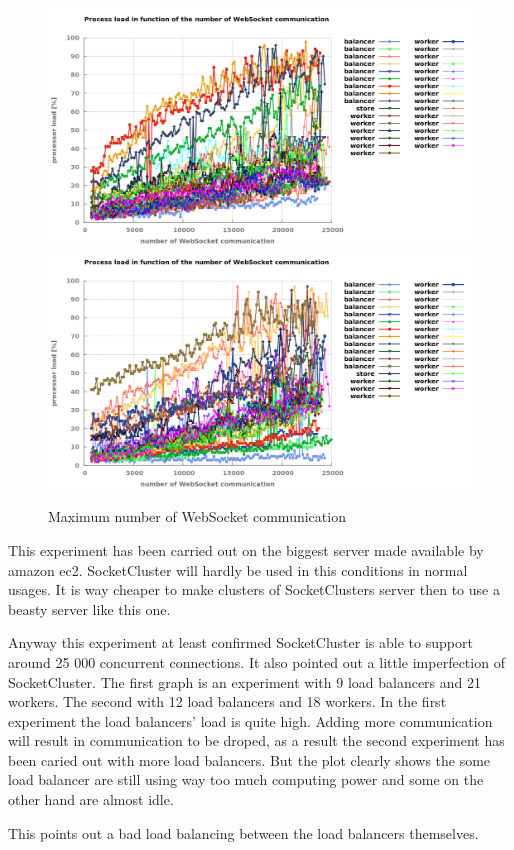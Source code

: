 \begin{figure}[H]
	\centering
		\includegraphics[width=\textwidth]{./Figures/9balancer.png}
		\includegraphics[width=\textwidth]{./Figures/12balancer.png}
	\caption[Maximum number of WebSocket communication]{Maximum number of WebSocket communication}
	\label{fig:max_communication}
\end{figure}

This experiment has been carried out on the biggest server made available by
amazon ec2.  SocketCluster will hardly be used in this conditions in normal
usages.  It is way cheaper to make clusters of SocketClusters server then to
use a beasty server like this one.

Anyway this experiment at least confirmed SocketCluster is able to support
around 25 000 concurrent connections. It also pointed out a little imperfection
of SocketCluster. The first graph is an experiment with 9 load balancers and 21
workers. The second with 12 load balancers and 18 workers.  In the first
experiment the load balancers' load is quite high. Adding more communication
will result in communication to be droped, as a result the second experiment
has been caried out with more load balancers. But the plot clearly shows the
some load balancer are still using way too much computing power and some on the
other hand are almost idle.

This points out a bad load balancing between the load balancers themselves.


